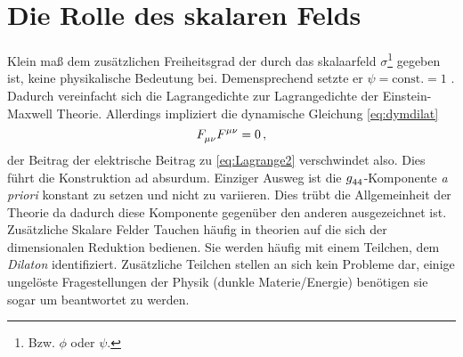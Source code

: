 \section{Die Rolle des skalaren Felds}
  Klein maß dem zusätzlichen Freiheitsgrad der durch das skalaarfeld
  $\sigma$\footnote{Bzw. $\phi$ oder $\psi$.} gegeben ist, keine physikalische
  Bedeutung bei.
  Demensprechend setzte er $\psi=\mathrm{const.}=1$ .
 Dadurch vereinfacht sich die Lagrangedichte zur Lagrangedichte der
 Einstein-Maxwell Theorie. Allerdings impliziert die dynamische Gleichung
 \eqref{eq:dymdilat}
  \begin{equation}
\tensor*{F}{_\mu_\nu}\tensor*{F}{^\mu^\nu}=0\,,
 \end{equation}
 der Beitrag der elektrische Beitrag zu \eqref{eq:Lagrange2} verschwindet also.
 Dies führt die Konstruktion ad absurdum. Einziger Ausweg ist die $\tensor{g}{_4_4}$-Komponente
\emph{a priori} konstant zu setzen und nicht zu variieren. Dies trübt
die Allgemeinheit der Theorie da dadurch diese Komponente gegenüber den anderen
ausgezeichnet ist. Zusätzliche Skalare Felder Tauchen häufig in theorien auf die
sich der dimensionalen Reduktion bedienen. Sie werden häufig mit einem Teilchen,
dem \emph{Dilaton} identifiziert. Zusätzliche Teilchen stellen an sich kein
Probleme dar, einige ungelöste Fragestellungen der Physik (dunkle
Materie/Energie) benötigen sie sogar um beantwortet zu werden. 
